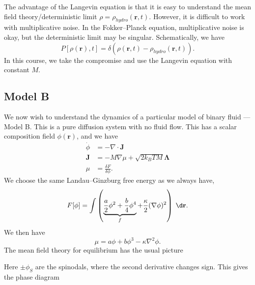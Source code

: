 \documentclass[a4paper]{article}
\begin{document}
The advantage of the Langevin equation is that it is easy to understand the mean field theory/deterministic limit $\rho = \rho_{hydro}(\mathbf{r}, t)$. However, it is difficult to work with multiplicative noise. In the Fokker--Planck equation, multiplicative noise is okay, but the deterministic limit may be singular. Schematically, we have
\[
  P[\rho(\mathbf{r}), t] = \delta(\rho(\mathbf{r}, t) - \rho_{hydro}(\mathbf{r}, t)).
\]
In this course, we take the compromise and use the Langevin equation with constant $M$.

\subsection{Model B}
We now wish to understand the dynamics of a particular model of binary fluid --- Model B. This is a pure diffusion system with no fluid flow. This has a scalar composition field $\phi(\mathbf{r})$, and we have
\begin{align*}
  \dot{\phi} &= - \nabla \cdot \mathbf{J}\\
  \mathbf{J} &= - M \nabla \mu + \sqrt{2k_B TM} \boldsymbol \Lambda\\
  \mu &= \frac{\delta F}{\delta \phi}.
\end{align*}
We choose the same Landau--Ginzburg free energy as we always have,
\[
  F[\phi] = \int \left(\underbrace{\frac{a}{2} \phi^2 + \frac{b}{4}\phi^4}_f + \frac{\kappa}{2} (\nabla \phi)^2\right)\;\d \mathbf{r}.
\]
We then have
\[
  \mu = a \phi + b \phi^3 - \kappa \nabla^2 \phi.
\]
The mean field theory for equilibrium has the usual picture
\begin{center}
\end{center}
Here $\pm \phi_S$ are the spinodals, where the second derivative changes sign. This gives the phase diagram
\end{document}
